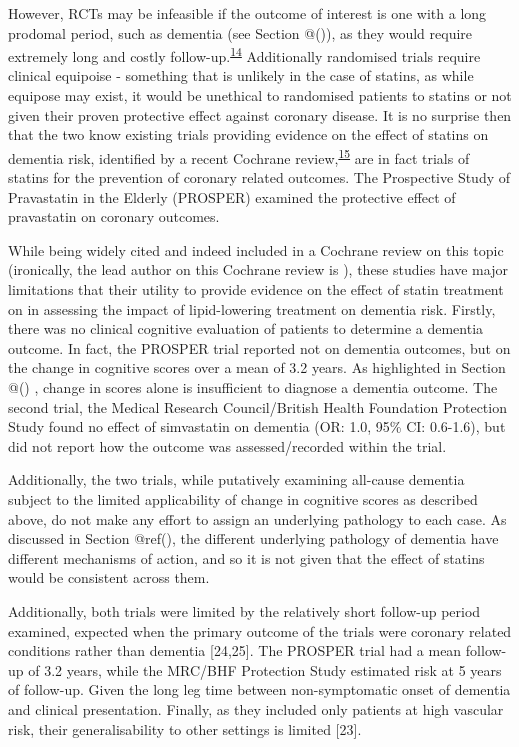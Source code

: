 \documentclass[a4paper, twoside]{templates/ociamthesis}
\begin{document}
However, RCTs may be infeasible if the outcome of interest is one with a long prodomal period, such as dementia (see Section @()), as they would require extremely long and costly follow-up.\textsuperscript{\protect\hyperlink{ref-ritchie2015}{14}} Additionally randomised trials require clinical equipoise - something that is unlikely in the case of statins, as while equipose may exist, it would be unethical to randomised patients to statins or not given their proven protective effect against coronary disease. It is no surprise then that the two know existing trials providing evidence on the effect of statins on dementia risk, identified by a recent Cochrane review,\textsuperscript{\protect\hyperlink{ref-mcguinness2016a}{15}} are in fact trials of statins for the prevention of coronary related outcomes. The Prospective Study of Pravastatin in the Elderly (PROSPER) examined the protective effect of pravastatin on coronary outcomes.

While being widely cited and indeed included in a Cochrane review on this topic (ironically, the lead author on this Cochrane review is ), these studies have major limitations that their utility to provide evidence on the effect of statin treatment on in assessing the impact of lipid-lowering treatment on dementia risk. Firstly, there was no clinical cognitive evaluation of patients to determine a dementia outcome. In fact, the PROSPER trial reported not on dementia outcomes, but on the change in cognitive scores over a mean of 3.2 years. As highlighted in Section @() , change in scores alone is insufficient to diagnose a dementia outcome. The second trial, the Medical Research Council/British Health Foundation Protection Study found no effect of simvastatin on dementia (OR: 1.0, 95\% CI: 0.6-1.6), but did not report how the outcome was assessed/recorded within the trial.

Additionally, the two trials, while putatively examining all-cause dementia subject to the limited applicability of change in cognitive scores as described above, do not make any effort to assign an underlying pathology to each case. As discussed in Section @ref(), the different underlying pathology of dementia have different mechanisms of action, and so it is not given that the effect of statins would be consistent across them.

Additionally, both trials were limited by the relatively short follow-up period examined, expected when the primary outcome of the trials were coronary related conditions rather than dementia {[}24,25{]}. The PROSPER trial had a mean follow-up of 3.2 years, while the MRC/BHF Protection Study estimated risk at 5 years of follow-up. Given the long leg time between non-symptomatic onset of dementia and clinical presentation. Finally, as they included only patients at high vascular risk, their generalisability to other settings is limited {[}23{]}.
\end{document}
